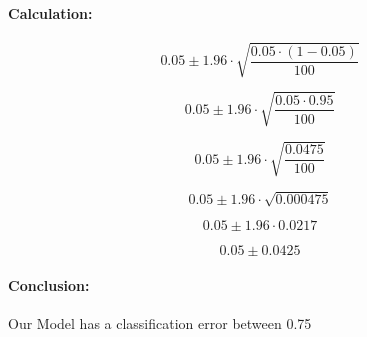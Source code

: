 \documentclass[a4paper,13pt,twoside]{book}
\begin{document}
\paragraph{Calculation:}

$$
0.05 \pm
1.96 \cdot 
\sqrt{
\frac
{0.05 \cdot (1 - 0.05)}
{100}
}
$$

$$
0.05 \pm
1.96 \cdot
\sqrt{
\frac
{0.05 \cdot 0.95}
{100}
}
$$

$$
0.05 \pm
1.96 \cdot
\sqrt{
\frac
{0.0475}
{100}
}
$$

$$
0.05 \pm
1.96 \cdot
\sqrt{0.000475}
$$

$$
0.05 \pm
1.96 \cdot 0.0217
$$

$$
0.05 \pm 0.0425
$$

\paragraph{Conclusion:}

Our Model has a classification error between 0.75%
\end{document}
